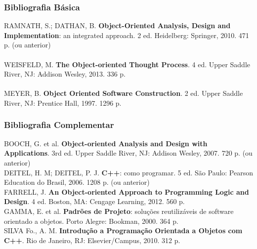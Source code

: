 \documentclass[aspectratio=169]{beamer}
\begin{document}
\begin{frame}\frametitle{Bibliografia Básica}
RAMNATH, S.; DATHAN, B. \textbf{Object-Oriented Analysis, Design and Implementation}: an integrated approach. 2 ed. Heidelberg: Springer, 2010. 471 p. (ou anterior)\\
~\\
WEISFELD, M. \textbf{The Object-oriented Thought Process}. 4 ed. Upper Saddle River, NJ: Addison Wesley, 2013. 336 p.\\
~\\
MEYER, B. \textbf{Object Oriented Software Construction}. 2 ed. Upper Saddle River, NJ: Prentice Hall, 1997. 1296 p.
\end{frame}


\begin{frame}\frametitle{Bibliografia Complementar}
BOOCH, G. et al. \textbf{Object-oriented Analysis and Design with Applications}. 3rd ed. Upper Saddle River, NJ: Addison Wesley, 2007. 720 p. (ou anterior)\\
DEITEL, H. M; DEITEL, P. J. \textbf{C++}: como programar. 5 ed. São Paulo: Pearson Education do Brasil, 2006. 1208 p. (ou anterior)\\
FARRELL, J. \textbf{An Object-oriented Approach to Programming Logic and Design}. 4 ed. Boston, MA: Cengage Learning, 2012. 560 p.\\
GAMMA, E. et al. \textbf{Padrões de Projeto}: soluções reutilizáveis de software orientado a objetos. Porto Alegre: Bookman, 2000. 364 p.\\
SILVA Fo., A. M. \textbf{Introdução a Programação Orientada a Objetos com C++}. Rio de Janeiro, RJ: Elsevier/Campus, 2010. 312 p.
\end{frame}
\end{document}
